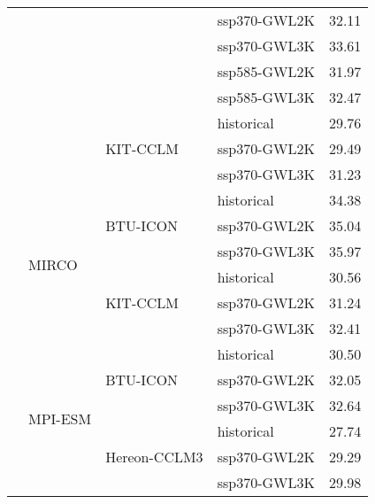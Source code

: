 \begin{table}[!htbp]
\begin{tabular}{lll|l|r}
 &  &  & ssp370-GWL2K & 32.11 \\
 &  &  & ssp370-GWL3K & 33.61 \\
 &  &  & ssp585-GWL2K & 31.97 \\
 &  &  & ssp585-GWL3K & 32.47 \\
\cmidrule(lr){3-5}
 &  & \multirow{3}{*}{KIT-CCLM} & historical & 29.76 \\
 &  &  & ssp370-GWL2K & 29.49 \\
 &  &  & ssp370-GWL3K & 31.23 \\
\cmidrule(lr){3-5}
\cmidrule(lr){2-5}
 & \multirow{6}{*}{MIRCO} & \multirow{3}{*}{BTU-ICON} & historical & 34.38 \\
 &  &  & ssp370-GWL2K & 35.04 \\
 &  &  & ssp370-GWL3K & 35.97 \\
\cmidrule(lr){3-5}
 &  & \multirow{3}{*}{KIT-CCLM} & historical & 30.56 \\
 &  &  & ssp370-GWL2K & 31.24 \\
 &  &  & ssp370-GWL3K & 32.41 \\
\cmidrule(lr){3-5}
\cmidrule(lr){2-5}
 & \multirow{6}{*}{MPI-ESM} & \multirow{3}{*}{BTU-ICON} & historical & 30.50 \\
 &  &  & ssp370-GWL2K & 32.05 \\
 &  &  & ssp370-GWL3K & 32.64 \\
\cmidrule(lr){3-5}
 &  & \multirow{3}{*}{Hereon-CCLM3} & historical & 27.74 \\
 &  &  & ssp370-GWL2K & 29.29 \\
 &  &  & ssp370-GWL3K & 29.98 \\
\bottomrule
\end{tabular}
\end{table}
